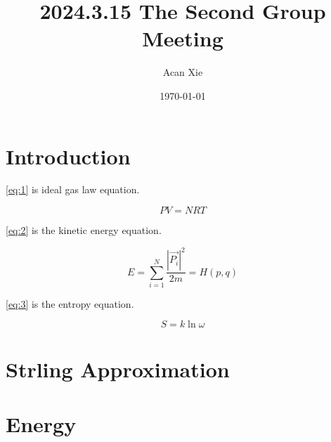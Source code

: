 \documentclass{article}
\title{2024.3.15 The Second Group Meeting}
\author{Acan Xie}
\date{\today}
\begin{document}
\maketitle

\section{Introduction}

\eqref{eq:1} is ideal gas law equation.

\begin{equation}\label{eq:1}
    PV=NRT
\end{equation}

\eqref{eq:2} is the kinetic energy equation.

\begin{equation}\label{eq:2}
    E = \sum_{i=1}^{N}\frac{|\vec{P_i}|^2}{2m}=H(p,q)
\end{equation}

\eqref{eq:3} is the entropy equation.

\begin{equation}\label{eq:3}
    S=k\ln\omega
\end{equation}

\section{Strling Approximation}

\section{Energy}
\end{document}
